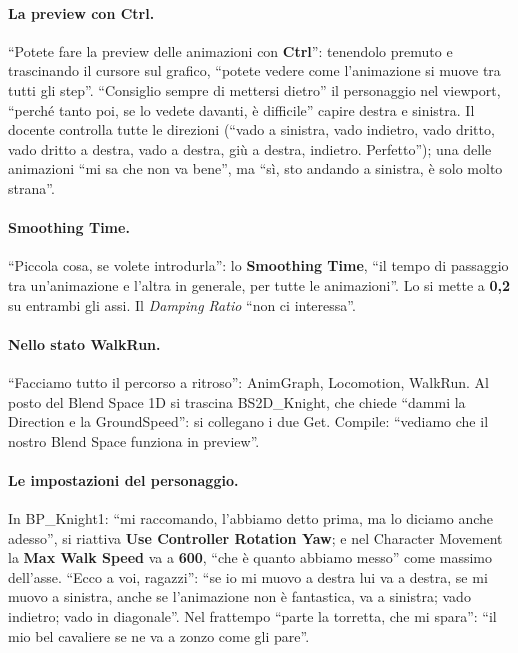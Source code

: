 \paragraph{La preview con Ctrl.} ``Potete fare la preview delle animazioni con
\textbf{Ctrl}'': tenendolo premuto e trascinando il cursore sul grafico, ``potete vedere
come l'animazione si muove tra tutti gli step''. ``Consiglio sempre di mettersi dietro''
il personaggio nel viewport, ``perché tanto poi, se lo vedete davanti, è difficile'' capire
destra e sinistra. Il docente controlla tutte le direzioni (``vado a sinistra, vado
indietro, vado dritto, vado dritto a destra, vado a destra, giù a destra, indietro.
Perfetto''); una delle animazioni ``mi sa che non va bene'', ma ``sì, sto andando a
sinistra, è solo molto strana''.

\paragraph{Smoothing Time.} ``Piccola cosa, se volete introdurla'': lo \textbf{Smoothing
Time}, ``il tempo di passaggio tra un'animazione e l'altra in generale, per tutte le
animazioni''. Lo si mette a \textbf{0,2} su entrambi gli assi. Il \emph{Damping Ratio}
``non ci interessa''.

\paragraph{Nello stato WalkRun.} ``Facciamo tutto il percorso a ritroso'': AnimGraph,
Locomotion, WalkRun. Al posto del Blend Space 1D si trascina BS2D\_Knight, che chiede
``dammi la Direction e la GroundSpeed'': si collegano i due Get. Compile: ``vediamo che il
nostro Blend Space funziona in preview''.

\paragraph{Le impostazioni del personaggio.} In BP\_Knight1: ``mi raccomando, l'abbiamo
detto prima, ma lo diciamo anche adesso'', si riattiva \textbf{Use Controller Rotation
Yaw}; e nel Character Movement la \textbf{Max Walk Speed} va a \textbf{600}, ``che è
quanto abbiamo messo'' come massimo dell'asse. ``Ecco a voi, ragazzi'': ``se io mi muovo a
destra lui va a destra, se mi muovo a sinistra, anche se l'animazione non è fantastica,
va a sinistra; vado indietro; vado in diagonale''. Nel frattempo ``parte la torretta, che
mi spara'': ``il mio bel cavaliere se ne va a zonzo come gli pare''.

